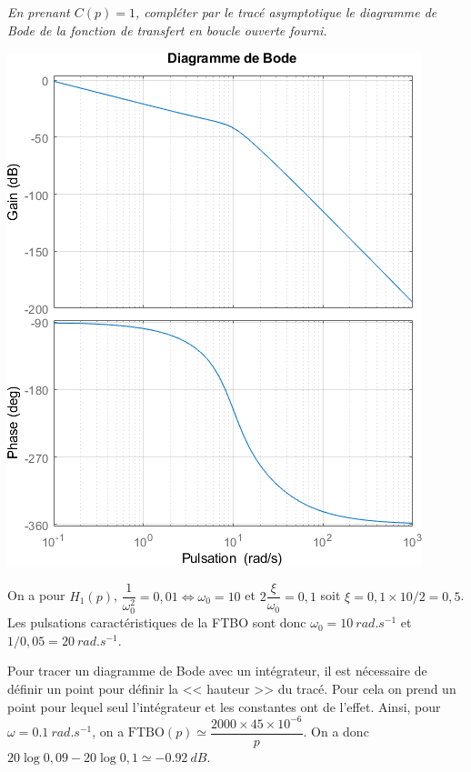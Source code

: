 \documentclass[10pt,fleqn]{article} %
\begin{document}
\begin{multicols}{2}
\subparagraph{}\textit{En prenant $C(p)=1$, compléter par le tracé asymptotique le diagramme
de Bode de la fonction de transfert en boucle ouverte fourni.}%
\begin{center}
\includegraphics[width=\linewidth]{images/BodeQ1}
\end{center}


\ifprof
\begin{corrige}
On a pour $H_1(p)$, $\dfrac{1}{\omega_0^2}=0,01 \Leftrightarrow \omega_0=10$ et $2\dfrac{\xi}{\omega_0}=0,1$ soit $\xi = 0,1\times 10 / 2 = 0,5$. Les pulsations caractéristiques de la FTBO sont donc $\omega_0=\SI{10}{rad.s^{-1}}$ et $1/0,05 = \SI{20}{rad.s^{-1}}$.

Pour tracer un diagramme de Bode avec un intégrateur, il est nécessaire de définir un point pour définir la << hauteur >> du tracé. Pour cela on prend un point pour lequel seul l'intégrateur et les constantes ont de l'effet. Ainsi, pour $\omega=\SI{0,1}{rad.s^{-1}}$, on a $\text{FTBO}(p) \simeq \dfrac{2000\times 45\times 10^{-6}}{p}$. On a donc $20\log 0,09 - 20 \log 0,1 \simeq \SI{-0,92}{dB}$.


\end{corrige}
\end{multicols}
\end{document}
